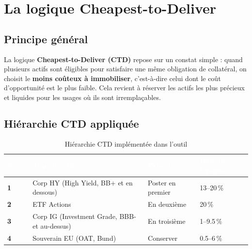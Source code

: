 \documentclass[12pt,a4paper]{article}
\begin{document}
\section{La logique Cheapest-to-Deliver}

\subsection{Principe général}

La logique \textbf{Cheapest-to-Deliver (CTD)} repose sur un constat simple : quand
plusieurs actifs sont éligibles pour satisfaire une même obligation de collatéral,
on choisit le \textbf{moins coûteux à immobiliser}, c'est-à-dire celui dont le coût
d'opportunité est le plus faible. Cela revient à réserver les actifs les plus précieux
et liquides pour les usages où ils sont irremplaçables.

\subsection{Hiérarchie CTD appliquée}

\begin{table}[H]
\centering
\renewcommand{\arraystretch}{1.4}
\begin{tabularx}{\linewidth}{p{2cm} X p{3cm} p{2.5cm}}
\toprule
\rowcolor{natixisBlue}
\textcolor{white}{\textbf{Score}} &
\textcolor{white}{\textbf{Type d'actif}} &
\textcolor{white}{\textbf{Priorité}} &
\textcolor{white}{\textbf{Haircut typique}} \\
\midrule
\rowcolor{accentRedBg}
\textbf{1} & Corp HY (High Yield, BB+ et en dessous) & Poster en premier & 13--20\,\% \\
\rowcolor{accentOrangeBg}
\textbf{2} & ETF Actions & En deuxième & 20\,\% \\
\rowcolor{natixisGray}
\textbf{3} & Corp IG (Investment Grade, BBB- et au-dessus) & En troisième & 1--9.5\,\% \\
\rowcolor{accentGreenBg}
\textbf{4} & Souverain EU (OAT, Bund) & Conserver & 0.5--6\,\% \\
\bottomrule
\end{tabularx}
\caption{Hiérarchie CTD implémentée dans l'outil}
\end{table}
\end{document}
